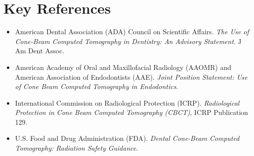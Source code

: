 \section{Key References}
\begin{itemize}
    \item American Dental Association (ADA) Council on Scientific Affairs. \textit{The Use of Cone-Beam Computed Tomography in Dentistry: An Advisory Statement}. J Am Dent Assoc.
    \item American Academy of Oral and Maxillofacial Radiology (AAOMR) and American Association of Endodontists (AAE). \textit{Joint Position Statement: Use of Cone Beam Computed Tomography in Endodontics}.
    \item International Commission on Radiological Protection (ICRP). \textit{Radiological Protection in Cone Beam Computed Tomography (CBCT)}, ICRP Publication 129.
    \item U.S. Food and Drug Administration (FDA). \textit{Dental Cone-Beam Computed Tomography: Radiation Safety Guidance}.
\end{itemize}
